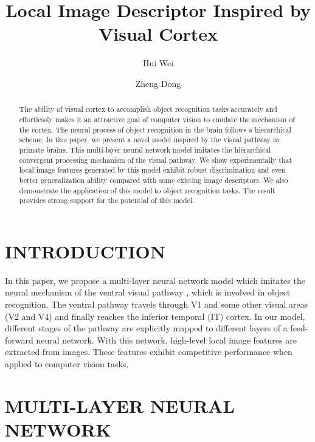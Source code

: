 \documentclass{ecai2014}
\begin{document}
\title{Local Image Descriptor Inspired by Visual Cortex}

\author{Hui Wei \and Zheng Dong }

\maketitle


\begin{abstract}
The ability of visual cortex to accomplish object recognition
tasks accurately and effortlessly makes it an attractive
goal of computer vision to emulate the mechanism of the cortex. 
The neural process of object recognition in the brain follows a hierarchical scheme.
In this paper, we present a novel model inspired by the visual pathway in primate brains.
This multi-layer neural network model imitates
the hierarchical convergent processing mechanism of the visual pathway.
We show experimentally that local image features generated by this model exhibit robust discrimination 
and even better generalization ability compared with some existing image descriptors.
We also demonstrate the application of this model to object recognition tasks. 
The result provides strong support for the potential of this model.
\end{abstract}

\section{INTRODUCTION}

In this paper, we propose a multi-layer neural network model which imitates the neural mechanism
of the ventral visual pathway \cite{Lehky2007}, which is involved in object recognition.
The ventral pathway travels through V1 and some other visual areas (V2 and V4) 
and finally reaches the inferior temporal (IT) cortex.
In our model, different stages of the pathway are explicitly mapped 
to different layers of a feed-forward neural network.
With this network, high-level local image features are extracted from images.
These features exhibit competitive performance when applied to computer vision tasks.

\section{MULTI-LAYER NEURAL NETWORK}\label{sec:model}
\end{document}
